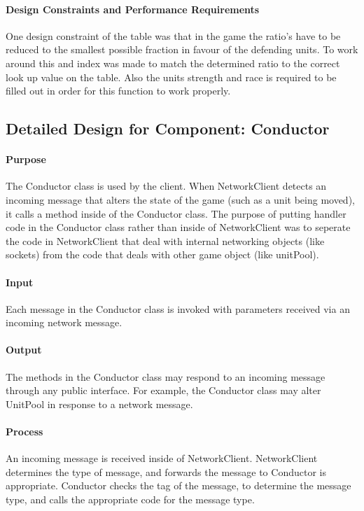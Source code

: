 \documentclass[12pt,a4paper]{article}
\begin{document}
\paragraph{Design Constraints and Performance Requirements} One design constraint of the table was that in the game the ratio's have to be reduced to the smallest possible fraction in favour of the defending units. To work around this and index was made to match the determined ratio to the correct look up value on the table. Also the units strength and race is required to be filled out in order for this function to work properly. 

\subsection{Detailed Design for Component: Conductor}
\paragraph{Purpose} The Conductor class is used by the client. When NetworkClient detects an incoming message that alters the state of the game (such as a unit being moved), it calls a method inside of the Conductor class. The purpose of putting handler code in the Conductor class rather than inside of NetworkClient was to seperate the code in NetworkClient that deal with internal networking objects (like sockets) from the code that deals with other game object (like unitPool).
\paragraph{Input} Each message in the Conductor class is invoked with parameters received via an incoming network message.
\paragraph{Output} The methods in the Conductor class may respond to an incoming message through any public interface. For example, the Conductor class may alter UnitPool in response to a network message.
\paragraph{Process} An incoming message is received inside of NetworkClient. NetworkClient determines the type of message, and forwards the message to Conductor is appropriate. Conductor checks the tag of the message, to determine the message type, and calls the appropriate code for the message type.
\end{document}
